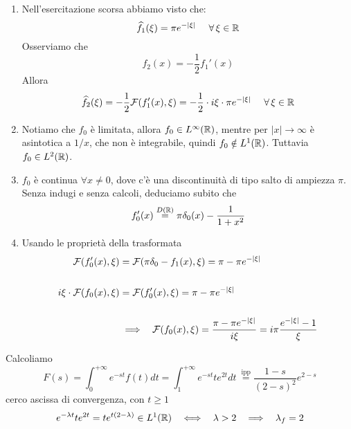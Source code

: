 \begin{enumerate}
\item Nell'esercitazione scorsa abbiamo visto che:
\begin{equation*}
\hat{f}_{1}(\xi) = \pi e^{- | \xi |} \ \ \ \ \forall \xi \in \RR 
\end{equation*}Osserviamo che
\begin{equation*}
f_{2}(x) = - \frac{1}{2} f_{1} '(x)
\end{equation*}Allora
\begin{equation*}
\hat{f}_{2}(\xi) = - \frac{1}{2}\Fc (f_{1} '(x), \xi) = - \frac{1}{2} \cdot i\xi \cdot \pi e^{- | \xi |} \ \ \ \ \forall \xi \in \RR 
\end{equation*}
\item Notiamo che $f_{0}$ è limitata, allora $f_{0} \in L^{\infty}(\mathbb{R})$, mentre per $| x| \rightarrow \infty $ è asintotica a $1/x$, che non è integrabile, quindi $f_{0} \notin L^{1}(\mathbb{R})$. Tuttavia $f_{0} \in L^{2}(\mathbb{R})$.
\item $f_{0}$ è continua $\forall x\neq 0$, dove c'è una discontinuità di tipo salto di ampiezza $\pi $. Senza indugi e senza calcoli, deduciamo subito che
\begin{equation*}
f_{0} '(x)\overset{D(\mathbb{R})}{=} \pi \delta_{0}(x) - \frac{1}{1 + x^{2}}
\end{equation*}
\item Usando le proprietà della trasformata
\begin{align*}
\mathcal{F} (f_{0} '(x), \xi) & = \mathcal{F} (\pi \delta_{0} - f_{1}(x), \xi) = \pi - \pi e^{- | \xi |}\\
 & \\
i\xi \cdot\mathcal{F} (f_{0}(x), \xi) & = \mathcal{F} (f_{0} '(x), \xi) = \pi - \pi e^{- | \xi |}\\
 & \\
 & \implies \ \ \mathcal{F} (f_{0}(x), \xi) = \frac{\pi - \pi e^{- | \xi |}}{i\xi} = i\pi \frac{e^{- | \xi |} - 1}{\xi}
\end{align*}
\end{enumerate}
\Soluzione

Calcoliamo
\begin{equation*}
F(s) = \int^{+ \infty}_{0} e^{- st} f(t) dt = \int^{+ \infty}_{1} e^{- st} te^{2t} dt\ \overset{\text{ipp}}{=}\frac{1 - s}{(2 - s)^{2}} e^{2 - s}
\end{equation*}
cerco ascissa di convergenza, con $t \geq 1$
\begin{equation*}
e^{- \lambda t} te^{2t} = te^{t(2 - \lambda)} \in L^{1}(\RR) \ \ \iff \ \ \lambda  > 2\ \ \implies \ \ \lambda_{f} = 2
\end{equation*}
\Soluzione

